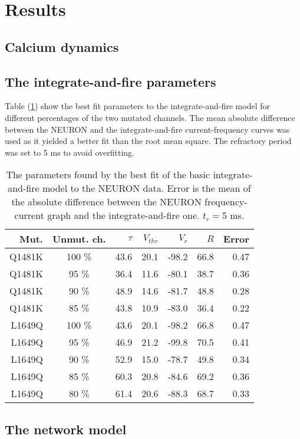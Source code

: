 \documentclass[twocolumn, a4paper,10pt, norsk]{scrartcl}
\begin{document}
\section*{Results}
\subsection*{Calcium dynamics}
\subsection*{The integrate-and-fire parameters}
Table (\ref{table:integrate-and-fire_parameters}) show the best fit parameters to the integrate-and-fire model for different percentages of the two mutated channels. The mean absolute difference between the NEURON and the integrate-and-fire current-frequency curves was used as it yielded a better fit than the root mean square. The refractory period was set to 5 ms to avoid overfitting.

\begin{table}
 \centering
 \caption{The parameters found by the best fit of the basic integrate-and-fire model to the NEURON data. Error is the mean of the absolute difference between the NEURON frequency-current graph and the integrate-and-fire one. $t_r=$5 ms.}
 \begin{tabular}{r|c|r|r|r|r|r} 
  Mut. & Unmut. ch. & $\tau$ & $V_{thr}$ & $V_{r}$ & $R$ & Error\\
  \hline
  Q1481K & 100 \% & 43.6 & 20.1 & -98.2 & 66.8 & 0.47\\
  Q1481K &  95 \% & 36.4 & 11.6 & -80.1 & 38.7 & 0.36\\
  Q1481K &  90 \% & 48.9 & 14.6 & -81.7 & 48.8 & 0.28\\
  Q1481K &  85 \% & 43.8 & 10.9 & -83.0 & 36.4 & 0.22\\
  \hline
  L1649Q & 100 \% & 43.6 & 20.1 & -98.2 & 66.8 & 0.47\\
  L1649Q &  95 \% & 46.9 & 21.2 & -99.8 & 70.5 & 0.41\\
  L1649Q &  90 \% & 52.9 & 15.0 & -78.7 & 49.8 & 0.34\\
  L1649Q &  85 \% & 60.3 & 20.8 & -84.6 & 69.2 & 0.36\\
  L1649Q &  80 \% & 61.4 & 20.6 & -88.3 & 68.7 & 0.33\\
 \end{tabular}
\label{table:integrate-and-fire_parameters}
\end{table}

\subsection*{The network model}
\end{document}
